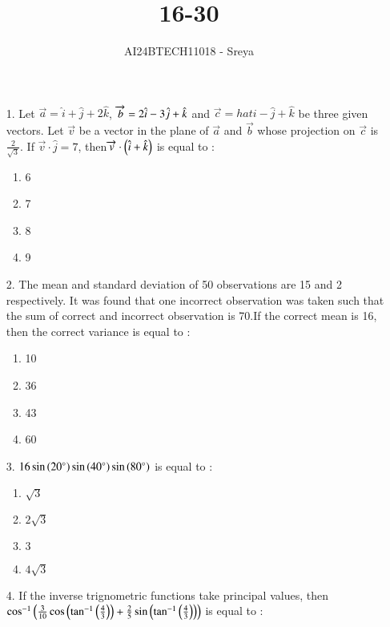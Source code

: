 \documentclass[journal,12pt,onecolumn]{IEEEtran}
\theoremstyle{remark}
\begin{document}

\vspace{3cm}

\title{16-30}
\author{AI24BTECH11018 - Sreya}
\maketitle
\bigskip
\renewcommand{\thefigure}{\theenumi}
\renewcommand{\thetable}{\theenumi}
\begin{enumerate}
    \item[1.] Let $\overrightarrow{a}=\hat{i}+\hat{j}+2\hat{k}$, $\overrightarrow{b}=2\hat{i}-3\Hat{j}+\hat{k}$ and $\overrightarrow{c}=hat{i}-\hat{j}+\hat{k}$ be three given vectors. Let $\overrightarrow{v}$ be a vector in the plane of $\overrightarrow{a}$ and $\overrightarrow{b}$ whose projection on $\overrightarrow{c}$ is $\frac{2}{\sqrt{3}}$. If $\overrightarrow{v}\cdot\hat{j}=7$, then$\overrightarrow{v}\cdot\left(\hat{i}+\hat{k}\right)$ is equal to :
    \begin{enumerate}
        \item 6
        \item 7
        \item 8
        \item 9
    \end{enumerate}
    \item[2.] The mean and standard deviation of 50 observations are 15 and 2 respectively. It was found that one incorrect observation was taken such that the sum of correct and incorrect observation is 70.If the correct mean is 16, then the correct variance is equal to :
    \begin{enumerate}
        \item 10
        \item 36
        \item 43
        \item 60
    \end{enumerate}
    \item[3.] $16\sin{\ensuremath{\left(20^\circ\right)}}\sin{\ensuremath{\left(40^\circ\right)}}\sin{\ensuremath{\left(80^\circ\right)}}$ is equal to :
    \begin{enumerate}
        \item $\sqrt{3}$
        \item $2\sqrt{3}$
        \item $3$
        \item $4\sqrt{3}$
    \end{enumerate}
    \item[4.] If the inverse trignometric functions take principal values, then $\cos^{-1}\left(\frac{3}{10}\cos\left(\tan^{-1}\left(\frac{4}{3}\right)\right)+\frac{2}{5}\sin\left(\tan^{-1}\left(\frac{4}{3}\right)\right)\right)$ is equal to :

\end{enumerate}
\end{document}
